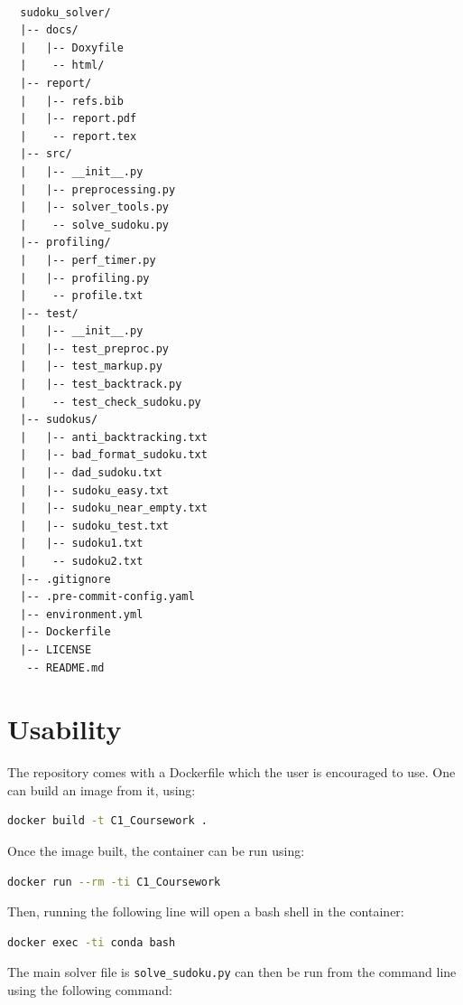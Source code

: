 \documentclass[12pt]{report} %
\begin{document}
\begin{lstlisting}[caption={Directory Structure},basicstyle=\tiny]
  
  sudoku_solver/
  |-- docs/
  |   |-- Doxyfile
  |    -- html/
  |-- report/
  |   |-- refs.bib
  |   |-- report.pdf
  |    -- report.tex
  |-- src/
  |   |-- __init__.py
  |   |-- preprocessing.py
  |   |-- solver_tools.py
  |    -- solve_sudoku.py
  |-- profiling/
  |   |-- perf_timer.py
  |   |-- profiling.py
  |    -- profile.txt
  |-- test/
  |   |-- __init__.py
  |   |-- test_preproc.py
  |   |-- test_markup.py
  |   |-- test_backtrack.py
  |    -- test_check_sudoku.py
  |-- sudokus/
  |   |-- anti_backtracking.txt
  |   |-- bad_format_sudoku.txt
  |   |-- dad_sudoku.txt
  |   |-- sudoku_easy.txt
  |   |-- sudoku_near_empty.txt
  |   |-- sudoku_test.txt
  |   |-- sudoku1.txt
  |    -- sudoku2.txt
  |-- .gitignore
  |-- .pre-commit-config.yaml
  |-- environment.yml
  |-- Dockerfile
  |-- LICENSE
   -- README.md

\end{lstlisting}

\section{Usability}

The repository comes with a Dockerfile which the user is encouraged to use. One can build an image from it, using:

\begin{lstlisting}[language=bash, caption={How to build the Docker image}]
  docker build -t C1_Coursework .
\end{lstlisting}

Once the image built, the container can be run using:

\begin{lstlisting}[language=bash, caption={How to run the Docker container}]
  docker run --rm -ti C1_Coursework
\end{lstlisting}

Then, running the following line will open a bash shell in the container:

\begin{lstlisting}[language=bash, caption={How to open a bash shell in the container}]
  docker exec -ti conda bash
\end{lstlisting}

The main solver file is \texttt{solve\_sudoku.py} can then be run from the command line using the following command:
\end{document}
